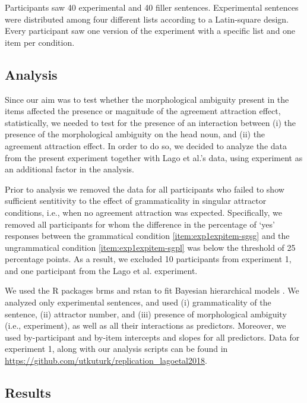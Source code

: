 \documentclass[doc,a4paper,man,natbib,floatsintext,noextraspace]{apa6}\usepackage[]{graphicx}\usepackage[]{color}
\begin{document}
Participants saw 40 experimental and 40 filler sentences. Experimental sentences were distributed among four different lists according to a Latin-square design. Every participant saw one version of the experiment with a specific list and one item per condition.   

\subsection{Analysis} \label{sec:exp1:analysis}

Since our aim was to test whether the morphological ambiguity present in the \citet{LagoEtAl:2018} items affected the presence or magnitude of the agreement attraction effect, statistically, we needed to test for the presence of an interaction between 
(i) the presence of the morphological ambiguity on the head noun, and 
(ii) the agreement attraction effect. 
In order to do so, we decided to analyze the data from the present experiment together with Lago et al.'s data, using experiment as an additional factor in the analysis.


Prior to analysis we removed the data for all participants who failed to show sufficient sentitivity to the effect of grammaticality in singular attractor conditions, i.e., when no agreement attraction was expected. Specifically, we removed all participants for whom the difference in the percentage of `yes' responses between the grammatical condition \ref{item:exp1expitem-sgsg} and the ungrammatical condition \ref{item:exp1expitem-sgpl} was below the threshold of 25 percentage points. As a result, we excluded 10 participants from experiment 1, and  one participant from the Lago et al. experiment.

We used the R packages brms \citep{R-brms_b} and rstan \citep{R-stan} to fit Bayesian hierarchical models \citep[e.g.,][]{GelmanHill:2007}. We analyzed only experimental sentences, and used 
(i) grammaticality of the sentence, 
(ii) attractor number, and 
(iii) presence of morphological ambiguity (i.e., experiment), as well as all their interactions as predictors. 
Moreover, we used by-participant and by-item intercepts and slopes for all predictors.
Data for experiment 1, along with our analysis scripts can be found in \url{https://github.com/utkuturk/replication_lagoetal2018}.


\subsection{Results} \label{sec:exp1:results}
\end{document}
